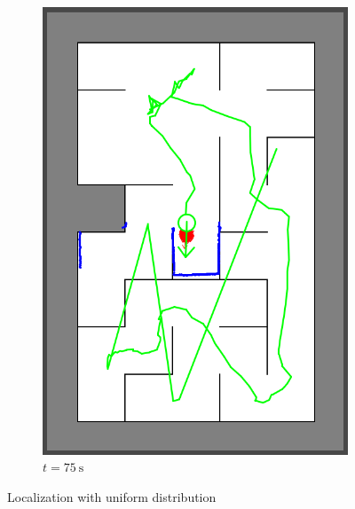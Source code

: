 \begin{figure}[H]
\begin{subfigure}{0.2\textwidth}
         \includegraphics[width=\textwidth]{figures/localization_75s.png}
         \caption{$t = \SI{75}{\second}$}
         \label{mapping20s}
     \end{subfigure}
        \caption{Localization with uniform distribution}
        \label{fig:three graphs}
\end{figure}



